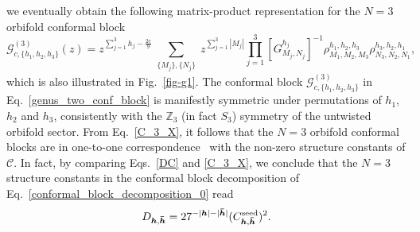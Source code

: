 \documentclass[a4paper,11pt]{article}
\begin{document}
we eventually obtain the following matrix-product representation for the $N=3$ orbifold 
conformal block \cite{Collier}
\begin{equation}\label{genus_two_conf_block}
 \mathcal{G}_{c, \{h_1, h_2, h_3\}}^{(3)}(z)=
z^{\sum_{j=1}^3 h_j-\frac{2c}{9}}\sum_{\substack{\{M_j\}, \{N_j\}}}
 z^{\sum\limits_{j=1}^3 |M_j|}
 \prod_{j=1}^3 [G_{M_j,N_j}^{h_j}]^{-1}
 \rho^{h_1,h_2,h_3}_{M_1,M_2,M_3}\rho_{N_3,N_2,N_1}^{h_3,h_2,h_1},
\end{equation}
which is also illustrated in Fig.~\ref{fig-g1}.
The conformal block $\mathcal{G}_{c, \{h_1, h_2, h_3\}}^{(3)}$ in Eq.~\eqref{genus_two_conf_block} is
manifestly symmetric under permutations of $h_1$, $h_2$ and $h_3$, consistently with the $\mathbb Z_3$ 
(in fact $S_3$) symmetry of the untwisted orbifold sector. From Eq.~\eqref{C_3_X}, it follows that the 
$N=3$ orbifold conformal blocks are in one-to-one correspondence~\cite{Cardy, Collier} with the non-zero structure constants 
of $\mathcal{C}$. In fact, by comparing Eqs.~\eqref{DC} and \eqref{C_3_X}, we conclude that the $N=3$ structure constants 
in the conformal block decomposition of Eq.~\eqref{conformal_block_decomposition_0} 
read
\begin{equation}\label{D_3}
 D_{\boldsymbol{h}, \boldsymbol{\bar{h}}}=
 27^{-|\boldsymbol{h}|-|\boldsymbol{\bar{h}}|}
 (C_{\boldsymbol{h}, \boldsymbol{\bar{h}}}^{{\rm seed}})^2.
\end{equation}
\end{document}
